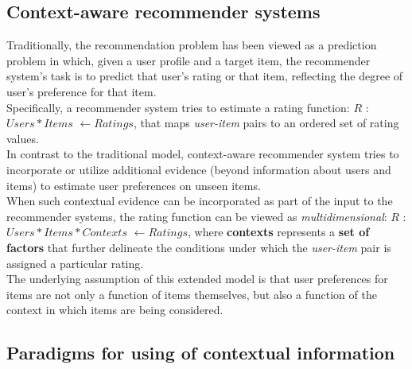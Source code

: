 \subsection{Context-aware recommender systems}

Traditionally, the recommendation problem has been viewed as a
prediction problem in which, given a user profile and a target item,
the recommender system's task is to predict that user's rating or that
item, reflecting the degree of user's preference for that item. \\
Specifically, a recommender system tries to estimate a rating
function: $R$ : $Users * Items$ $ \leftarrow Ratings$, that maps
\textit{user-item} pairs to an ordered  set of rating values.\\
In contrast to the traditional model, context-aware recommender system
tries to incorporate or utilize additional evidence (beyond
information about users and items) to estimate user preferences on
unseen items.\\ When such contextual evidence can be incorporated as
part of the input to the recommender systems, the rating function can
be viewed as \textit{multidimensional}: $R$ : $Users * Items *
Contexts$ $ \leftarrow Ratings$, where \textbf{contexts} represents a
\textbf{set of factors} that further delineate the conditions under which the
\textit{user-item} pair is assigned a particular rating. \\ The
underlying assumption of this extended model is that user preferences
for items are not only a function of items themselves, but also a
function of the context in which items are being
considered\cite{lim2009assessing}. 

\subsection{Paradigms for using of contextual information}


